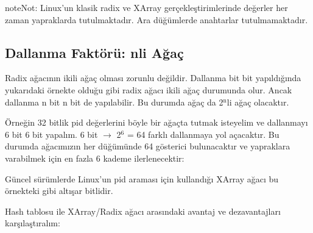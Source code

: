 \documentclass[a4paper,10pt,turkish]{sphinxmanual}
\begin{document}
\begin{sphinxadmonition}{note}{Not:}
\sphinxAtStartPar
Linux’un klasik radix ve XArray gerçekleştirimlerinde değerler her zaman yapraklarda tutulmaktadır.
Ara düğümlerde anahtarlar tutulmamaktadır.
\end{sphinxadmonition}


\subsection{Dallanma Faktörü: n\sphinxhyphen{}li Ağaç}
\label{\detokenize{processcontrolblock:dallanma-faktoru-n-li-agac}}
\sphinxAtStartPar
Radix ağacının ikili ağaç olması zorunlu değildir. Dallanma bit bit yapıldığında yukarıdaki örnekte
olduğu gibi radix ağacı ikili ağaç durumunda olur. Ancak dallanma n bit n bit de yapılabilir. Bu
durumda ağaç da 2$^{\text{n}}$\sphinxhyphen{}li ağaç olacaktır.

\sphinxAtStartPar
Örneğin 32 bitlik pid değerlerini böyle bir ağaçta tutmak isteyelim ve dallanmayı 6 bit 6 bit yapalım.
6 bit \(\rightarrow\) 2$^{\text{6}}$ = 64 farklı dallanmaya yol açacaktır. Bu durumda ağacımızın her düğümünde 64
gösterici bulunacaktır ve yapraklara varabilmek için en fazla 6 kademe ilerlenecektir:


\sphinxAtStartPar
Güncel sürümlerde Linux’un pid araması için kullandığı XArray ağacı bu örnekteki gibi altışar bitlidir.

\sphinxAtStartPar
Hash tablosu ile XArray/Radix ağacı arasındaki avantaj ve dezavantajları karşılaştıralım:
\end{document}
